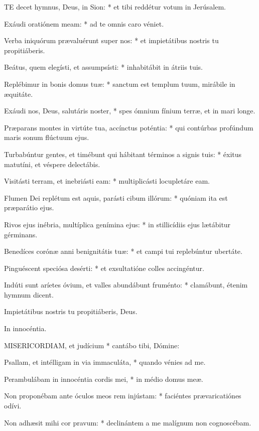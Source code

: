
\lettrine[lines=2]{T}{E} decet hymnus, Deus, in Sion: * et tibi reddétur votum in Jerúsalem.

Exáudi oratiónem meam: * ad te omnis caro véniet.

Verba iniquórum prævaluérunt super nos: * et impietátibus nostris tu propitiáberis.

Beátus, quem elegísti, et assumpsísti: * inhabitábit in átriis tuis.

Replébimur in bonis domus tuæ: * sanctum est templum tuum, mirábile in æquitáte.

Exáudi nos, Deus, salutáris noster, * spes ómnium fínium terræ, et in mari longe.

Præparans montes in virtúte tua, accínctus poténtia: * qui contúrbas profúndum maris sonum flúctuum ejus.

Turbabúntur gentes, et timébunt qui hábitant términos a signis tuis: * éxitus matutíni, et véspere delectábis.

Visitásti terram, et inebriásti eam: * multiplicásti locupletáre eam.

Flumen Dei replétum est aquis, parásti cibum illórum: * quóniam ita est præparátio ejus.

Rivos ejus inébria, multíplica genímina ejus: * in stillicídiis ejus lætábitur gérminans.

Benedíces corónæ anni benignitátis tuæ: * et campi tui replebúntur ubertáte.

Pinguéscent speciósa desérti: * et exsultatióne colles accingéntur.

Indúti sunt aríetes óvium, et valles abundábunt fruménto: * clamábunt, étenim hymnum dicent.

 Impietátibus nostris tu propitiáberis, Deus.

 In innocéntia.


\lettrine[lines=2]{M}{ISERICORDIAM}, et judícium * cantábo tibi, Dómine:

Psallam, et intélligam in via immaculáta, * quando vénies ad me.

Perambulábam in innocéntia cordis mei, * in médio domus meæ.

Non proponébam ante óculos meos rem injústam: * faciéntes prævaricatiónes odívi.

Non adhæsit mihi cor pravum: * declinántem a me malígnum non cognoscébam.

